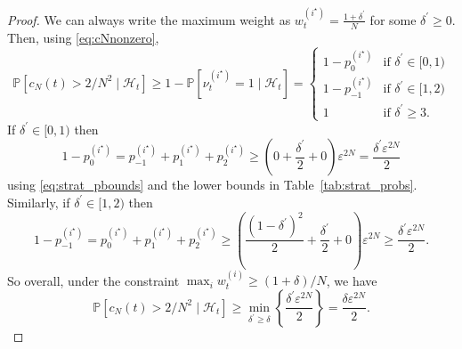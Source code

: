 \documentclass{article}
\theoremstyle{definition}
\newcommand{\Prob}{\mathbb{P}}
\newcommand{\1}[1]{\mathbbm{1}_{#1}} %
\begin{document}
\begin{proof}
We can always write the maximum weight as $w_t^{(i^\star)} = \frac{1+\delta^\prime}{N}$ for some $\delta^\prime \geq 0$. Then, using \eqref{eq:cNnonzero},
\begin{equation*}
\Prob[ c_N(t) > 2/N^2 \mid \mathcal{H}_t ]
\geq 1- \Prob[ \nu_t^{(i^\star)} =1 \mid \mathcal{H}_t ]
= \begin{cases}
    1 - p_0^{(i^\star)} & \text{if } \delta^\prime \in [0,1) \\
    1 - p_{-1}^{(i^\star)} & \text{if } \delta^\prime \in [1,2) \\
    1 & \text{if } \delta^\prime \geq 3 .
\end{cases}
\end{equation*}
If $\delta^\prime \in [0,1)$ then
\begin{equation*}
1 - p_0^{(i^\star)}
= p_{-1}^{(i^\star)} + p_1^{(i^\star)} + p_2^{(i^\star)}
\geq \left( 0 + \frac{\delta^\prime}{2} + 0 \right) \varepsilon^{2N} 
= \frac{\delta^\prime \varepsilon^{2N} }{2}
\end{equation*}
using \eqref{eq:strat_pbounds} and the lower bounds in Table~\ref{tab:strat_probs}.
Similarly, if $\delta^\prime \in [1,2)$ then
\begin{equation*}
1 - p_{-1}^{(i^\star)}
= p_0^{(i^\star)} + p_1^{(i^\star)} + p_2^{(i^\star)}
\geq \left( \frac{(1-\delta^\prime)^2}{2} + \frac{\delta^\prime}{2} + 0 \right)
        \varepsilon^{2N} 
\geq \frac{\delta^\prime \varepsilon^{2N} }{2} .
\end{equation*}
So overall, under the constraint $\max_i w_t^{(i)} \geq (1+\delta)/N$, we have
\begin{equation*}
\Prob[ c_N(t) > 2/N^2 \mid \mathcal{H}_t ]
\geq \min_{\delta^\prime \geq \delta} 
        \left\{ \frac{\delta^\prime \varepsilon^{2N} }{2} \right\}
= \frac{ \delta \varepsilon^{2N} }{2} .
\end{equation*}


\end{proof}
\end{document}
